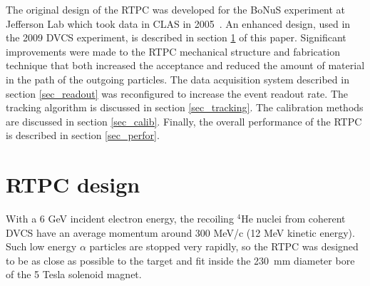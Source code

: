 \documentclass[preprint,5p]{elsarticle}
\begin{document}
The original design of the RTPC was developed for the BoNuS 
experiment at Jefferson Lab which took data in CLAS in 2005~\cite{BONUS-NIM}. An enhanced design, 
used in the 2009 DVCS experiment, is described in section \ref{sec_design} 
of this paper. Significant improvements were made to the RTPC mechanical 
structure and fabrication technique that both increased the acceptance and 
reduced the amount of material in the path of the outgoing particles. The 
data acquisition system described in section \ref{sec_readout} was reconfigured 
to increase the event readout rate. The tracking algorithm is discussed in section
\ref{sec_tracking}. The calibration methods 
are discussed in section \ref{sec_calib}. Finally, the overall performance
of the RTPC is described in section \ref{sec_perfor}.

\section{RTPC design} \label{sec_design}

With a 6 GeV incident electron energy, the recoiling $^{4}$He nuclei from coherent 
DVCS have an average momentum around 300 MeV/c (12 MeV kinetic energy). Such low energy $\alpha$ 
particles are stopped very rapidly, so the RTPC was designed to be as close 
as possible to the target and fit inside the 230~mm diameter bore of the 
5 Tesla solenoid magnet. 
\end{document}

